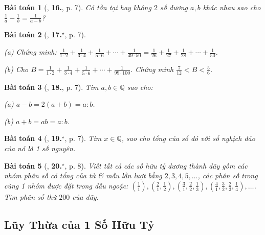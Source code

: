 \documentclass{article}
\numberwithin{equation}{section}
\newtheorem{baitoan}{Bài toán}[section]
\begin{document}
\begin{baitoan}[\cite{Binh_Toan_7_tap_1}, \textbf{16.}, p. 7]
	Có tồn tại hay không $2$ số dương $a,b$ khác nhau sao cho $\frac{1}{a} - \frac{1}{b} = \frac{1}{a - b}$?
\end{baitoan}

\begin{baitoan}[\cite{Binh_Toan_7_tap_1}, \textbf{17.}${}^\star$, p. 7]
	\begin{enumerate*}
		\item[(a)] Chứng minh: $\frac{1}{1\cdot 2} + \frac{1}{3\cdot 4} + \frac{1}{5\cdot 6} + \cdots + \frac{1}{49\cdot 50} = \frac{1}{26} + \frac{1}{27} + \frac{1}{28} + \cdots + \frac{1}{50}$.
		\item[(b)] Cho $B = \frac{1}{1\cdot 2} + \frac{1}{3\cdot 4} + \frac{1}{5\cdot 6} + \cdots + \frac{1}{99\cdot 100}$. Chứng minh $\frac{7}{12} < B < \frac{5}{6}$.
	\end{enumerate*}	
\end{baitoan}

\begin{baitoan}[\cite{Binh_Toan_7_tap_1}, \textbf{18.}, p. 7]
	Tìm $a,b\in\mathbb{Q}$ sao cho:
	\begin{enumerate*}
		\item[(a)] $a - b = 2(a + b) = a:b$.
		\item[(b)] $a + b = ab = a:b$.
	\end{enumerate*}
\end{baitoan}

\begin{baitoan}[\cite{Binh_Toan_7_tap_1}, \textbf{19.}${}^\star$, p. 7]
	Tìm $x\in\mathbb{Q}$, sao cho tổng của số đó với số nghịch đảo của nó là 1 số nguyên.
\end{baitoan}

\begin{baitoan}[\cite{Binh_Toan_7_tap_1}, \textbf{20.}${}^\star$, p. 8]
	Viết tất cả các số hữu tỷ dương  thành dãy gồm các nhóm phân số có tổng của tử \& mẫu lần lượt bằng $2,3,4,5,\ldots$, các phân số trong cùng 1 nhóm được đặt trong dấu ngoặc: $\left(\frac{1}{1}\right),\left(\frac{2}{1},\frac{1}{2}\right),\left(\frac{3}{1},\frac{2}{2},\frac{1}{3}\right),\left(\frac{4}{1},\frac{3}{2},\frac{2}{3},\frac{1}{4}\right),\ldots$. Tìm phân số thứ $200$ của dãy.
\end{baitoan}


\subsection{Lũy Thừa của 1 Số Hữu Tỷ}
\end{document}
